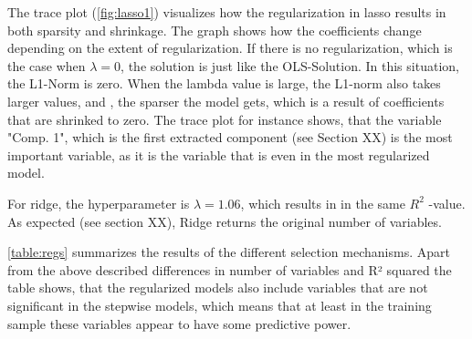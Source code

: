 The trace plot (\autoref{fig:lasso1}) visualizes how the regularization in lasso results in both sparsity and shrinkage. The graph shows how the coefficients change depending on the extent of regularization. If there is no regularization, which is the case when $\lambda=0$, the solution is just like the OLS-Solution. In this situation, the L1-Norm is zero. When the lambda value is large, the L1-norm also takes larger values, and , the sparser the model gets, which is a result of coefficients that are shrinked to zero. The trace plot for instance shows, that the variable  "Comp. 1", which is the first extracted component (see Section XX) is the most important variable, as it is the variable that is even in the most regularized model.  

For ridge, the hyperparameter is $\lambda = 1.06$, which results in in the same $R^{2}$ -value. As expected (see section XX), Ridge returns the original number of variables. 

\autoref{table:regs} summarizes the results of the different selection mechanisms. Apart from the above described differences in number of variables and R² squared the table shows, that the regularized models also include variables that are not significant in the stepwise models, which means that at least in the training sample these variables appear to have some predictive power. 

 
\label{table:regs}
 
\FloatBarrier